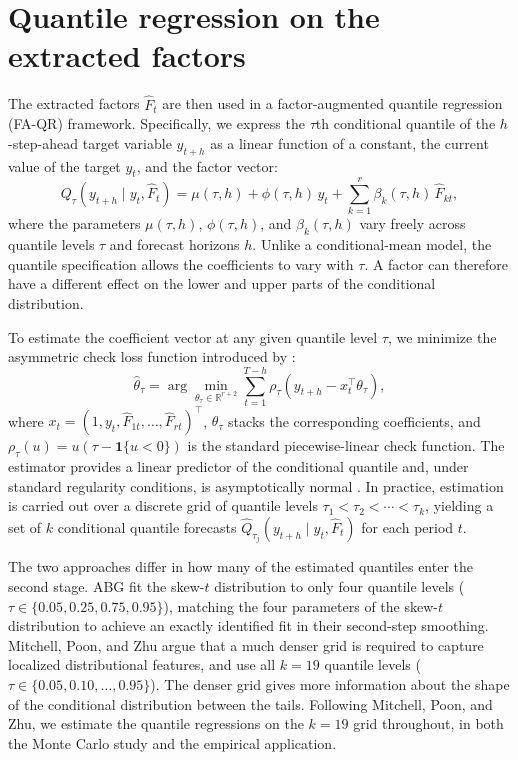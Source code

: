 \documentclass[12pt]{report} %
\begin{document}
\section{Quantile regression on the extracted factors}
\label{sec:qr}

The extracted factors $\hat{F}_t$ are then used in a factor-augmented quantile regression (FA-QR) framework. Specifically, we express the $\tau$th conditional quantile of the $h$-step-ahead target variable $y_{t+h}$ as a linear function of a constant, the current value of the target $y_t$, and the factor vector:
\[
Q_\tau(y_{t+h} \mid y_t, \hat{F}_t) = \mu(\tau, h) + \phi(\tau, h) \, y_t + \sum_{k=1}^{r} \beta_k(\tau, h) \, \hat{F}_{kt},
\]
where the parameters $\mu(\tau, h)$, $\phi(\tau, h)$, and $\beta_k(\tau, h)$ vary freely across quantile levels $\tau$ and forecast horizons $h$. Unlike a conditional-mean model, the quantile specification allows the coefficients to vary with $\tau$. A factor can therefore have a different effect on the lower and upper parts of the conditional distribution.

To estimate the coefficient vector at any given quantile level $\tau$, we minimize the asymmetric check loss function introduced by \textcite{koenker1978regression}:
\[
\hat{\theta}_\tau = \arg\min_{\theta_\tau \in \mathbb{R}^{r+2}} \sum_{t=1}^{T-h} \rho_\tau\!\left(y_{t+h} - x_t^\top \theta_\tau\right),
\]
where $x_t = (1, y_t, \hat{F}_{1t}, \ldots, \hat{F}_{rt})^\top$, $\theta_\tau$ stacks the corresponding coefficients, and $\rho_\tau(u) = u (\tau - \mathbf{1}\{u < 0\})$ is the standard piecewise-linear check function. The estimator provides a linear predictor of the conditional quantile and, under standard regularity conditions, is asymptotically normal \parencite{koenker2005quantile}. In practice, estimation is carried out over a discrete grid of quantile levels $\tau_1 < \tau_2 < \cdots < \tau_k$, yielding a set of $k$ conditional quantile forecasts $\hat{Q}_{\tau_j}(y_{t+h} \mid y_t, \hat{F}_t)$ for each period $t$.

The two approaches differ in how many of the estimated quantiles enter the second stage. ABG fit the skew-$t$ distribution to only four quantile levels ($\tau \in \{0.05, 0.25, 0.75, 0.95\}$), matching the four parameters of the skew-$t$ distribution to achieve an exactly identified fit in their second-step smoothing. Mitchell, Poon, and Zhu argue that a much denser grid is required to capture localized distributional features, and use all $k = 19$ quantile levels ($\tau \in \{0.05, 0.10, \ldots, 0.95\}$). The denser grid gives more information about the shape of the conditional distribution between the tails. Following Mitchell, Poon, and Zhu, we estimate the quantile regressions on the $k = 19$ grid throughout, in both the Monte Carlo study and the empirical application.
\end{document}

